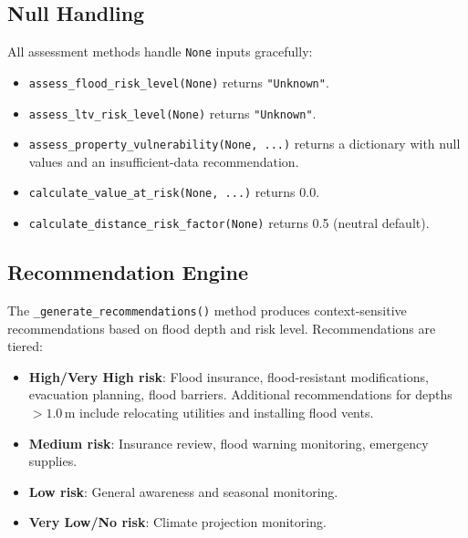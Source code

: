 \documentclass[11pt,a4paper]{article}
\begin{document}
\subsection{Null Handling}

All assessment methods handle \texttt{None} inputs gracefully:

\begin{itemize}
    \item \texttt{assess\_flood\_risk\_level(None)} returns \texttt{"Unknown"}.
    \item \texttt{assess\_ltv\_risk\_level(None)} returns \texttt{"Unknown"}.
    \item \texttt{assess\_property\_vulnerability(None, ...)} returns a dictionary with null values and an insufficient-data recommendation.
    \item \texttt{calculate\_value\_at\_risk(None, ...)} returns 0.0.
    \item \texttt{calculate\_distance\_risk\_factor(None)} returns 0.5 (neutral default).
\end{itemize}

\subsection{Recommendation Engine}

The \texttt{\_generate\_recommendations()} method produces context-sensitive recommendations based on flood depth and risk level. Recommendations are tiered:

\begin{itemize}
    \item \textbf{High/Very High risk}: Flood insurance, flood-resistant modifications, evacuation planning, flood barriers. Additional recommendations for depths $> 1.0$\,m include relocating utilities and installing flood vents.
    \item \textbf{Medium risk}: Insurance review, flood warning monitoring, emergency supplies.
    \item \textbf{Low risk}: General awareness and seasonal monitoring.
    \item \textbf{Very Low/No risk}: Climate projection monitoring.
\end{itemize}

\clearpage

\mkmsensitivity
\end{document}
